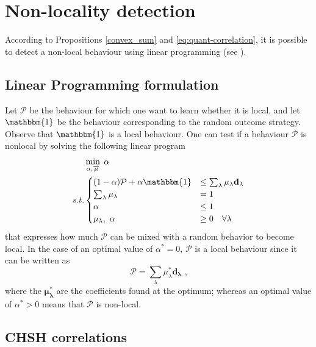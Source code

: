 \section{Non-locality detection}\label{sec:nonloc-detection}

According to Propositions \ref{convex_sum} and \ref{eq:quant-correlation}, it is possible to
detect a non-local behaviour using linear programming (see ).
\subsection{Linear Programming formulation}\label{primal-LP}
Let $\mathcal P$ be the behaviour for which one want to learn whether it is
local, and let $\mathbbm{1}$ be the behaviour corresponding to the random outcome
strategy. Observe that $\mathbbm{1}$ is a local behaviour. One can test if a behaviour $\mathcal P$
is nonlocal by solving the following linear program
\begin{equation} \label{eq:primal}
    \begin{aligned}
            & \min_{\alpha,\overrightarrow{\mu}} \; \alpha \\
	  s.t.  &
        \begin{cases}
            (1-\alpha) \mathcal{P}+ \alpha \mathbbm{1} & \leq \sum_\lambda\mu_\lambda \mathbf{d_\lambda} \\
            \sum_\lambda \mu_\lambda & = 1 \\
            \alpha & \leq 1 \\
            \mu_\lambda,\ \alpha & \geq 0 \quad \forall \lambda
        \end{cases}
    \end{aligned}
\end{equation}
that expresses how much $\mathcal P$ can be mixed with a random behavior to become local.
In the case of an optimal value of $\alpha^* = 0$, $\mathcal{P}$ is a local behaviour
since it can be written as
\begin{equation*}
    \mathcal{P} =  \sum_\lambda \mu^*_\lambda \mathbf{d_\lambda} \text{ ,}
\end{equation*}
where the $\mathbf{\mu^*_\lambda}$ are the coefficients found at the optimum; 
whereas an optimal value of $\alpha^* > 0$ means that $\mathcal{P}$ is non-local.
\subsection{CHSH correlations}\label{CHSH_primal}

